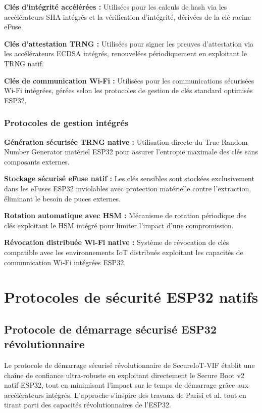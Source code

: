 \textbf{Clés d'intégrité accélérées :} Utilisées pour les calculs de hash via les accélérateurs SHA intégrés et la vérification d'intégrité, dérivées de la clé racine eFuse.

\textbf{Clés d'attestation TRNG :} Utilisées pour signer les preuves d'attestation via les accélérateurs ECDSA intégrés, renouvelées périodiquement en exploitant le TRNG natif.

\textbf{Clés de communication Wi-Fi :} Utilisées pour les communications sécurisées Wi-Fi intégrées, gérées selon les protocoles de gestion de clés standard optimisés ESP32.

\subsubsection{Protocoles de gestion intégrés}

\textbf{Génération sécurisée TRNG native :} Utilisation directe du True Random Number Generator matériel ESP32 pour assurer l'entropie maximale des clés sans composants externes.

\textbf{Stockage sécurisé eFuse natif :} Les clés sensibles sont stockées exclusivement dans les eFuses ESP32 inviolables avec protection matérielle contre l'extraction, éliminant le besoin de puces externes.

\textbf{Rotation automatique avec HSM :} Mécanisme de rotation périodique des clés exploitant le HSM intégré pour limiter l'impact d'une compromission.

\textbf{Révocation distribuée Wi-Fi native :} Système de révocation de clés compatible avec les environnements IoT distribués exploitant les capacités de communication Wi-Fi intégrées ESP32.

\section{Protocoles de sécurité ESP32 natifs}

\subsection{Protocole de démarrage sécurisé ESP32 révolutionnaire}

Le protocole de démarrage sécurisé révolutionnaire de SecureIoT-VIF établit une chaîne de confiance ultra-robuste en exploitant directement le Secure Boot v2 natif ESP32, tout en minimisant l'impact sur le temps de démarrage grâce aux accélérateurs intégrés. L'approche s'inspire des travaux de Parisi et al. \cite{Parisi2024TitanCFI} tout en tirant parti des capacités révolutionnaires de l'ESP32.

